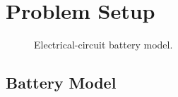\documentclass[../zhang_thesis.tex]{subfiles}
\begin{document}
\chapter{Problem Setup}


\begin{figure}[b]
\centering
%
\caption{Electrical-circuit battery model.}
\label{fig:batt_model}
\end{figure}

\section{Battery Model}
\label{sec:batt_mdl}
\end{document}
